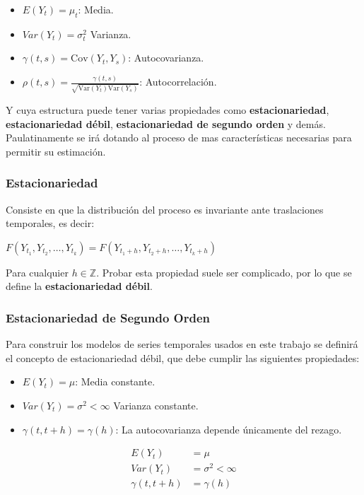 \documentclass[10pt,twoside,xcolor=table,x11anmes]{IEEEtran}
\begin{document}
\begin{itemize}
    \item $E(Y_t)=\mu_t$: Media.
    \item $Var(Y_t) = \sigma^2_t $ Varianza.
    \item $\gamma(t,s) = \text{Cov}(Y_t, Y_s)$: Autocovarianza.
    \item $\rho(t,s) = \frac{\gamma(t,s)}{\sqrt{\text{Var}(Y_t) \text{Var}(Y_s)}}$: Autocorrelación.
\end{itemize}

Y cuya estructura puede tener varias propiedades como \textbf{estacionariedad}, \textbf{estacionariedad débil}, \textbf{estacionariedad de segundo orden} y demás. Paulatinamente se irá dotando al proceso de mas características necesarias para permitir su estimación. 

\subsubsection{Estacionariedad}

Consiste en que la distribución del proceso es invariante ante traslaciones temporales, es decir:

$F(Y_{t_1},Y_{t_2},\dots,Y_{t_k})=F(Y_{t_1 + h},Y_{t_2 + h},\dots,Y_{t_k + h})$

Para cualquier $h\in \mathbb{Z}$. Probar esta propiedad suele ser complicado, por lo que se define la \textbf{estacionariedad débil}.

\subsubsection{Estacionariedad de Segundo Orden}

Para construir los modelos de series temporales usados en este trabajo se definirá el  concepto de estacionariedad débil, que debe cumplir las siguientes propiedades:

\begin{itemize}
    \item $E(Y_t)=\mu$: Media constante.
    \item $Var(Y_t) = \sigma^2 <\infty$ Varianza constante.
    \item $\gamma(t, t+h) = \gamma(h)$: La autocovarianza depende únicamente del rezago.
\end{itemize}

\begin{equation*}
    \begin{split}
        E(Y_t)&=\mu\\
        Var(Y_t) &= \sigma^2 <\infty\\
        \gamma(t, t+h) &= \gamma(h)\\
    \end{split}
\end{equation*}
\end{document}
